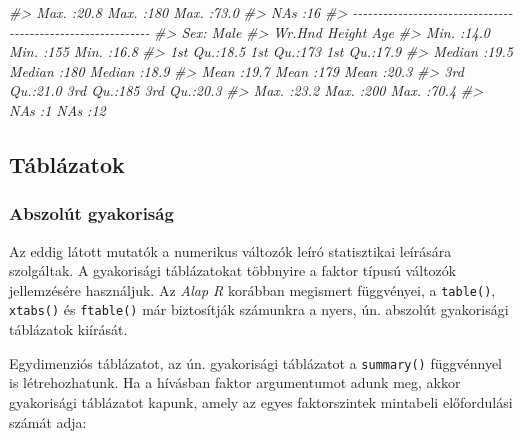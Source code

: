 \documentclass[
]{book}
\newenvironment{Shaded}{\begin{snugshade}}{\end{snugshade}}
\newcommand{\CommentTok}[1]{\textcolor[rgb]{0.56,0.35,0.01}{\textit{#1}}}
\newcommand{\FunctionTok}[1]{\textcolor[rgb]{0.00,0.00,0.00}{#1}}
\newcommand{\NormalTok}[1]{#1}
\newcommand{\SpecialCharTok}[1]{\textcolor[rgb]{0.00,0.00,0.00}{#1}}
\begin{document}
\begin{Shaded}
\begin{Highlighting}[]
\CommentTok{\#\textgreater{}  Max.   :20.8   Max.   :180   Max.   :73.0  }
\CommentTok{\#\textgreater{}                 NA\textquotesingle{}s   :16                  }
\CommentTok{\#\textgreater{} {-}{-}{-}{-}{-}{-}{-}{-}{-}{-}{-}{-}{-}{-}{-}{-}{-}{-}{-}{-}{-}{-}{-}{-}{-}{-}{-}{-}{-}{-}{-}{-}{-}{-}{-}{-}{-}{-}{-}{-}{-}{-}{-}{-}{-}{-}{-}{-}{-}{-}{-}{-}{-}{-}{-}{-}{-}{-}{-}{-} }
\CommentTok{\#\textgreater{} Sex: Male}
\CommentTok{\#\textgreater{}      Wr.Hnd         Height         Age      }
\CommentTok{\#\textgreater{}  Min.   :14.0   Min.   :155   Min.   :16.8  }
\CommentTok{\#\textgreater{}  1st Qu.:18.5   1st Qu.:173   1st Qu.:17.9  }
\CommentTok{\#\textgreater{}  Median :19.5   Median :180   Median :18.9  }
\CommentTok{\#\textgreater{}  Mean   :19.7   Mean   :179   Mean   :20.3  }
\CommentTok{\#\textgreater{}  3rd Qu.:21.0   3rd Qu.:185   3rd Qu.:20.3  }
\CommentTok{\#\textgreater{}  Max.   :23.2   Max.   :200   Max.   :70.4  }
\CommentTok{\#\textgreater{}  NA\textquotesingle{}s   :1      NA\textquotesingle{}s   :12}
\end{Highlighting}
\end{Shaded}

\hypertarget{tuxe1bluxe1zatok}{%
\subsection{Táblázatok}\label{tuxe1bluxe1zatok}}

\hypertarget{abszoluxfat-gyakorisuxe1g}{%
\subsubsection{Abszolút gyakoriság}\label{abszoluxfat-gyakorisuxe1g}}

Az eddig látott mutatók a numerikus változók leíró statisztikai leírására szolgáltak. A gyakorisági táblázatokat többnyire a faktor típusú változók jellemzésére használjuk. Az \emph{Alap R} korábban megismert függvényei, a \texttt{table()}, \texttt{xtabs()} és \texttt{ftable()} már biztosítják számunkra a nyers, ún. abszolút gyakorisági táblázatok kiírását.

Egydimenziós táblázatot, az ún. gyakorisági táblázatot a \texttt{summary()} függvénnyel is létrehozhatunk. Ha a hívásban faktor argumentumot adunk meg, akkor gyakorisági táblázatot kapunk, amely az egyes faktorszintek mintabeli előfordulási számát adja:

\begin{Shaded}
\end{Shaded}
\end{document}
